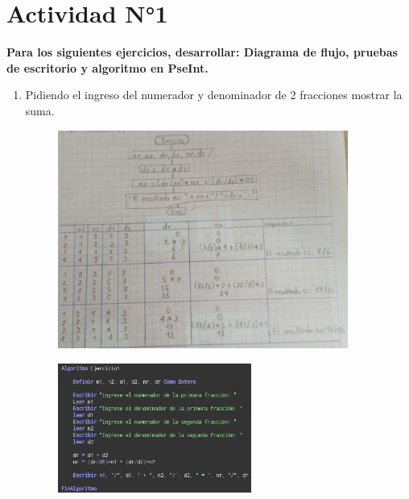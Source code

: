 \documentclass[12pt]{article}
\begin{document}
    
  
    \section*{\centering Actividad N°1}

        \textbf{Para los siguientes ejercicios, desarrollar: Diagrama de flujo, pruebas de escritorio y algoritmo en PseInt.}

        \begin{enumerate}
            \item  Pidiendo el ingreso del numerador y denominador de 2 fracciones mostrar la suma.
            
                \begin{figure}[!h]
                    \centering
                    \includegraphics[width=0.9\textwidth]{Img/DF_ej1.jpeg}
                \end{figure}

                \begin{figure}[!h]
                    \centering
                    \includegraphics[width=0.6\textwidth]{Img/Cod_ej1.png}
                \end{figure}


\end{enumerate}
\end{document}
